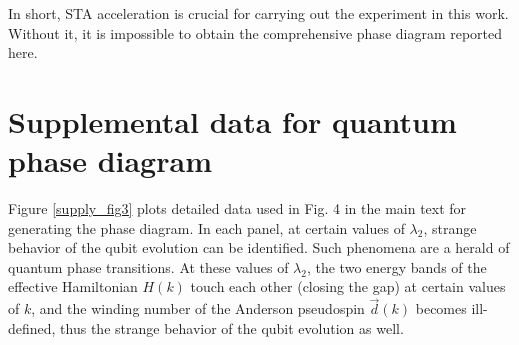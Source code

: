 \documentclass[aps,reprint,groupedaddress,showpacs,superscriptaddress]{revtex4-1}
\begin{document}
In short, STA acceleration is crucial for carrying out the experiment in this work. Without it, it is impossible to obtain the comprehensive phase diagram reported here.





\section{Supplemental data for quantum phase diagram}
Figure \ref{supply_fig3} plots detailed data used in Fig. 4 in the main text for generating the phase diagram. In each panel, at certain values of $\lambda_{2}$, strange behavior of the qubit evolution can be identified. Such phenomena are a herald of quantum phase transitions. At these values of $\lambda_{2}$, the two energy bands of the effective Hamiltonian $H(k)$ touch each other (closing the gap) at certain values of $k$, and the winding number of the Anderson pseudospin $\vec{d}(k)$ becomes ill-defined, thus the strange behavior of the qubit evolution as well. 
\end{document}
